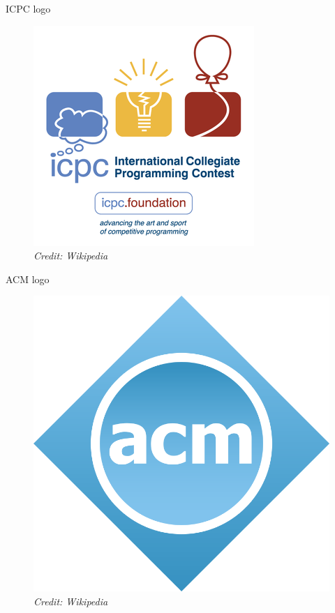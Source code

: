 \documentclass{beamer}
\begin{document}
\begin{frame}{ICPC logo}
\begin{figure}
  \centering
  \includegraphics[scale=0.8]{images/icpc-logo.png} \\
  {\tiny\itshape Credit: Wikipedia}
\end{figure}
\end{frame}

\begin{frame}{ACM logo}
\begin{figure}
  \centering
  \includegraphics[scale=0.15]{images/acm-logo.png} \\
  {\tiny\itshape Credit: Wikipedia}
\end{figure}
\end{frame}
\end{document}
